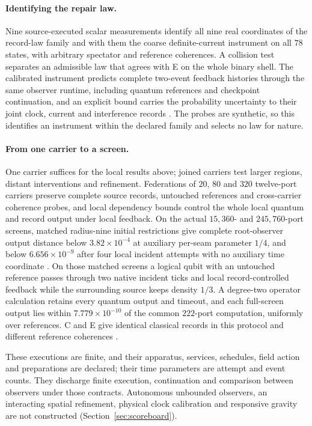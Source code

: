 \documentclass[11pt]{article}
\theoremstyle{definition}
\theoremstyle{remark}
\begin{document}
\paragraph{Identifying the repair law.} Nine source-executed scalar
measurements identify all nine real coordinates of the record-law family and
with them the coarse definite-current instrument on all $78$ states, with
arbitrary spectator and reference coherences. A collision test separates an
admissible law that agrees with E on the whole binary shell. The calibrated
instrument predicts complete two-event feedback histories through the same
observer runtime, including quantum references and checkpoint continuation,
and an explicit bound carries the probability uncertainty to their joint
clock, current and interference records \cite{ophidentification}. The
probes are synthetic, so this identifies an instrument within the declared
family and selects no law for nature.

\paragraph{From one carrier to a screen.} One carrier suffices for the local
results above; joined carriers test larger regions, distant interventions
and refinement. Federations of $20$, $80$ and $320$ twelve-port carriers
preserve complete source records, untouched references and cross-carrier
coherence probes, and local dependency bounds control the whole local
quantum and record output under local feedback. On the actual $15{,}360$-
and $245{,}760$-port screens, matched radius-nine initial restrictions give
complete root-observer output distance below $3.82\times10^{-4}$ at
auxiliary per-seam parameter $1/4$, and below $6.656\times10^{-9}$ after four
local incident attempts with no auxiliary time coordinate
\cite{ophnativeaction}. On those matched screens a logical qubit with an
untouched reference passes through two native incident ticks and local
record-controlled feedback while the surrounding source keeps density $1/3$.
A degree-two operator calculation retains every quantum output and timeout,
and each full-screen output lies within $7.779\times10^{-10}$ of the common
$222$-port computation, uniformly over references. C and E give identical
classical records in this protocol and different reference coherences
\cite{ophscreenobserver}.

These executions are finite, and their apparatus, services, schedules, field
action and preparations are declared; their time parameters are attempt and
event counts. They discharge finite execution, continuation and comparison
between observers under those contracts. Autonomous unbounded observers, an
interacting spatial refinement, physical clock calibration and responsive
gravity are not constructed (Section~\ref{sec:scoreboard}).
\end{document}
